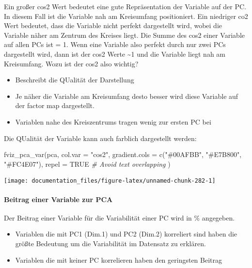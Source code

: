 \documentclass[
]{article}
\newenvironment{Shaded}{\begin{snugshade}}{\end{snugshade}}
\newcommand{\AttributeTok}[1]{\textcolor[rgb]{0.77,0.63,0.00}{#1}}
\newcommand{\CommentTok}[1]{\textcolor[rgb]{0.56,0.35,0.01}{\textit{#1}}}
\newcommand{\ConstantTok}[1]{\textcolor[rgb]{0.00,0.00,0.00}{#1}}
\newcommand{\FunctionTok}[1]{\textcolor[rgb]{0.00,0.00,0.00}{#1}}
\newcommand{\NormalTok}[1]{#1}
\newcommand{\StringTok}[1]{\textcolor[rgb]{0.31,0.60,0.02}{#1}}
\providecommand{\tightlist}{%
  \setlength{\itemsep}{0pt}\setlength{\parskip}{0pt}}
\begin{document}
Ein großer cos2 Wert bedeutet eine gute Repräsentation der Variable auf der PC. In diesem Fall ist die Variable nah am Kreisumfang positioniert.
Ein niedriger co2 Wert bedeutet, dass die Variable nicht perfekt dargestellt wird, wobei die Variable näher am Zentrum des Kreises liegt. Die Summe des cos2 einer Variable auf allen PCs ist = 1.
Wenn eine Variable also perfekt durch nur zwei PCs dargestellt wird, dann ist der cos2 Werte \textasciitilde1 und die Variable liegt nah am Kreisumfang. Wozu ist der cos2 also wichtig?

\begin{itemize}
\tightlist
\item
  Beschreibt die QUalität der Darstellung
\item
  Je näher die Variable am Kreisumfang desto besser wird diese Variable auf der factor map dargestellt.
\item
  Variablen nahe des Kreiszentrums tragen wenig zur ersten PC bei
\end{itemize}

Die QUalität der Variable kann auch farblich dargestellt werden:

\begin{Shaded}
\begin{Highlighting}[]

\FunctionTok{fviz\_pca\_var}\NormalTok{(pca, }\AttributeTok{col.var =} \StringTok{"cos2"}\NormalTok{, }\AttributeTok{gradient.cols =} \FunctionTok{c}\NormalTok{(}\StringTok{"\#00AFBB"}\NormalTok{, }\StringTok{"\#E7B800"}\NormalTok{, }\StringTok{"\#FC4E07"}\NormalTok{), }
             \AttributeTok{repel =} \ConstantTok{TRUE} \CommentTok{\# Avoid text overlapping}
\NormalTok{             )}
\end{Highlighting}
\end{Shaded}

\begin{center}\texttt{[image: documentation\_files/figure-latex/unnamed-chunk-282-1]} \end{center}

\hypertarget{beitrag-einer-variable-zur-pca}{%
\paragraph{Beitrag einer Variable zur PCA}\label{beitrag-einer-variable-zur-pca}}

Der Beitrag einer Variable für die Variabilität einer PC wird in \% angegeben.

\begin{itemize}
\tightlist
\item
  Variablen die mit PC1 (Dim.1) und PC2 (Dim.2) korreliert sind haben die größte Bedeutung um die Variabilität im Datensatz zu erklären.
\item
  Variablen die mit keiner PC korrelieren haben den geringsten Beitrag
\end{itemize}
\end{document}
